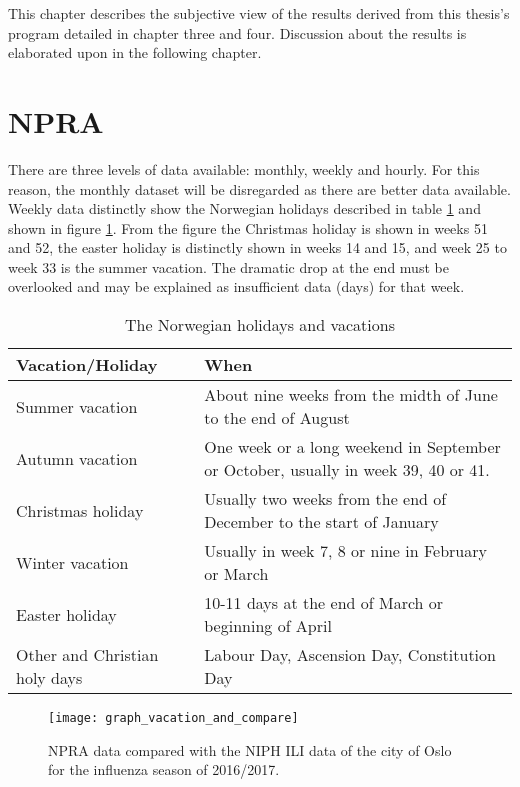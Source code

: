 This chapter describes the subjective view of the results derived from this thesis's program detailed in chapter three and four. Discussion about the results is elaborated upon in the following chapter.



\section{NPRA}
There are three levels of data available: monthly, weekly and hourly. For this reason, the monthly dataset will be disregarded as there are better data available. Weekly data distinctly show the Norwegian holidays described in table \ref{table:jesus} and shown in figure \ref{fig:graph_vacation_and_compare}. From the figure the Christmas holiday is shown in weeks 51 and 52, the easter holiday is distinctly shown in weeks 14 and 15, and week 25 to week 33 is the summer vacation. The dramatic drop at the end must be overlooked and may be explained as insufficient data (days) for that week. 

\begin{center}
\begin{table}[!h]
\begin{tabular}{ | m{9em} | m{10cm}| }
 \hline
 \textbf{Vacation/Holiday} & \textbf{When} \\ [0.5ex] 
 \hline
 Summer vacation & About nine weeks from the midth of June to the end of August  \\ 
 \hline 
 Autumn vacation & One week or a long weekend in September or October, usually in week 39, 40 or 41.\\ 
 \hline
 Christmas holiday & Usually two weeks from the end of December to the start of January\\ 
 \hline
 Winter vacation & Usually in week 7, 8 or nine in February or March \\ 
  \hline
 Easter holiday & 10-11 days at the end of March or beginning of April \\ 
  \hline
 Other and Christian holy days & Labour Day, Ascension Day, Constitution Day \\ 
  \hline
\end{tabular}
\caption{The Norwegian holidays and vacations}
 \label{table:jesus}
\end{table}
\end{center}

\begin{figure}[!htb]
\texttt{[image: graph\_vacation\_and\_compare]}
\centering
\caption{NPRA data compared with the NIPH ILI data of the city of Oslo for the influenza season of 2016/2017.}
\label{fig:graph_vacation_and_compare}
\end{figure}

